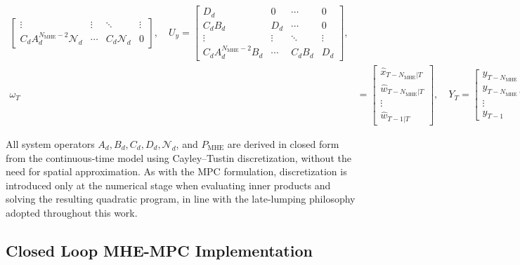 \begin{equation}
\begin{aligned}
\begin{bmatrix}
        \vdots & \vdots & \ddots & \vdots \\
        C_d A_d^{{N_{\mathrm{MHE}}}-2} \mathcal{N}_d & \cdots & C_d \mathcal{N}_d & 0
        \end{bmatrix}, \quad
        U_y =
        \begin{bmatrix}
        D_d & 0 & \cdots & 0 \\
        C_d B_d & D_d & \cdots & 0 \\
        \vdots & \vdots & \ddots & \vdots \\
        C_d A_d^{{N_{\mathrm{MHE}}}-2} B_d & \cdots & C_d B_d & D_d
        \end{bmatrix}, \\[1ex]
        \omega_T &=
        \left[
        \begin{array}{c}
        \hat{x}_{T-N_{\mathrm{MHE}}|T} \\
        \hline
        \hat{w}_{T-N_{\mathrm{MHE}}|T} \\
        \vdots \\
        \hat{w}_{T-1|T}
        \end{array}
        \right], \quad
        Y_T =
        \begin{bmatrix}
        y_{T-{N_{\mathrm{MHE}}}} \\
        y_{T-{N_{\mathrm{MHE}}}+1} \\
        \vdots \\
        y_{T-1}
        \end{bmatrix} \quad 
        U_T =
        \begin{bmatrix}
        u_{T-{N_{\mathrm{MHE}}}} \\
        u_{T-{N_{\mathrm{MHE}}}+1} \\
        \vdots \\
        u_{T-1}
        \end{bmatrix}
    \end{aligned}
\end{equation}


All system operators $A_d, B_d, C_d, D_d, \mathcal{N}_d$, and $P_{\mathrm{MHE}}$ are derived in closed form from the continuous-time model using Cayley--Tustin discretization, without the need for spatial approximation. As with the MPC formulation, discretization is introduced only at the numerical stage when evaluating inner products and solving the resulting quadratic program, in line with the late-lumping philosophy adopted throughout this work.

\subsection{Closed Loop MHE-MPC Implementation} \label{sec:3_mhe_mpc}

